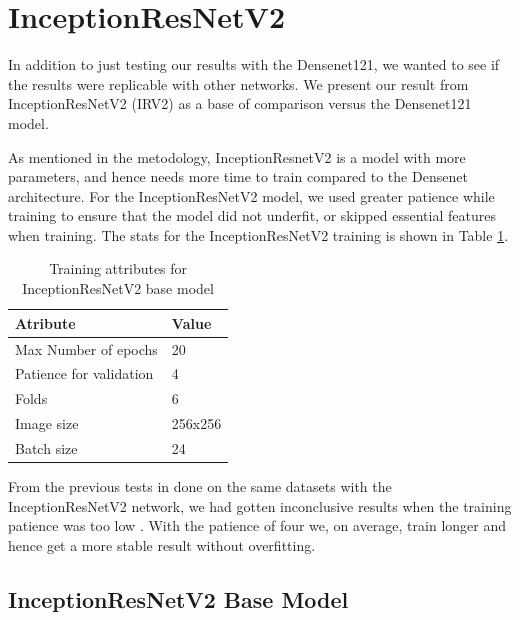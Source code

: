 \section{InceptionResNetV2}
In addition to just testing our results with the Densenet121, we wanted to see if the results were replicable with other networks. We present our result from InceptionResNetV2 (IRV2) as a base of comparison versus the Densenet121 model. 


As mentioned in the metodology, InceptionResnetV2 is a model with more parameters, and hence needs more time to train compared to the Densenet architecture. 
For the InceptionResNetV2 model, we used greater patience while training to ensure that the model did not underfit, or skipped essential features when training.
The stats for the InceptionResNetV2 training is shown in Table \ref{tab:TrainingAttrIRV2}.



\begin{table}[h]
\begin{center}
\begin{tabular}{ll}
\toprule
Atribute                & Value   \\
\midrule
Max Number of epochs    & 20      \\
Patience for validation & 4       \\
Folds                   & 6       \\
Image size              & 256x256 \\
Batch size              & 24      \\   
\bottomrule
\end{tabular}
\end{center}
\caption{Training attributes for InceptionResNetV2 base model }
\label{tab:TrainingAttrIRV2}
\end{table}

From the previous tests in done on the same datasets with the InceptionResNetV2 network, we had gotten inconclusive results when the training patience was too low \cite{Mathias2019IEEpaper}. With the patience of four we, on average, train longer and hence get a more stable result without overfitting.

\FloatBarrier
\subsection{InceptionResNetV2 Base Model}

